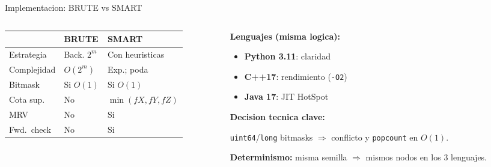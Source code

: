 \begin{frame}{Implementacion: BRUTE vs SMART}

\begin{columns}[T]
\begin{column}{0.54\textwidth}

\centering
\small
\begin{tabular}{lp{2.5cm}p{2.5cm}}
\toprule
 & \textbf{BRUTE} & \textbf{SMART} \\
\midrule
Estrategia & Back. $2^m$ & Con heuristicas \\
Complejidad & $O(2^m)$ & Exp.; poda \\
Bitmask & Si $O(1)$ & Si $O(1)$ \\
Cota sup. & No & $\min(fX,fY,fZ)$ \\
MRV & No & \alert{Si} \\
Fwd.\ check & No & \alert{Si} \\
\bottomrule
\end{tabular}

\end{column}

\begin{column}{0.43\textwidth}

\textbf{Lenguajes (misma logica):}
\begin{itemize}
  \item \textbf{Python 3.11}: claridad
  \item \textbf{C++17}: rendimiento (\texttt{-O2})
  \item \textbf{Java 17}: JIT HotSpot
\end{itemize}

\medskip
\textbf{Decision tecnica clave:}

\texttt{uint64}/\texttt{long} bitmasks $\Rightarrow$ conflicto y \texttt{popcount} en $O(1)$.

\medskip
\textbf{Determinismo:} misma semilla $\Rightarrow$ mismos nodos en los 3 lenguajes.

\end{column}
\end{columns}

\end{frame}
